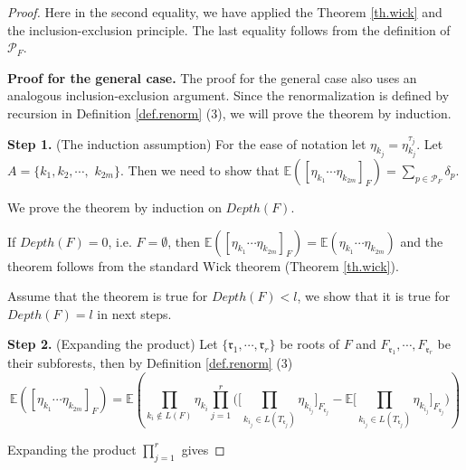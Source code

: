 \begin{proof}
Here in the second equality, we have applied the Theorem \ref{th.wick} and the inclusion-exclusion principle. The last equality follows from the definition of $\mathcal{P}_F$.

\textbf{Proof for the general case.} The proof for the general case also uses an analogous inclusion-exclusion argument. Since the renormalization is defined by recursion in Definition \ref{def.renorm} (3), we will prove the theorem by induction. 

\textbf{Step 1.} (The induction assumption) For the ease of notation let $\eta_{k_j}=\eta^{\tau_j}_{k_j}$. Let $A=\{k_1,k_2,\cdots,$ $k_{2m}\}$. Then we need to show that $\mathbb{E}([\eta_{k_1}\cdots \eta_{k_{2m}}]_F)=\sum_{p\in \mathcal{P}_F}\delta_p$.

We prove the theorem by induction on $Depth(F)$.

If $Depth(F)=0$, i.e. $F=\emptyset$, then $\mathbb{E}([\eta_{k_1}\cdots \eta_{k_{2m}}]_F)=\mathbb{E}(\eta_{k_1}\cdots \eta_{k_{2m}})$ and the theorem follows from the standard Wick theorem (Theorem \ref{th.wick}).

Assume that the theorem is true for $Depth(F)<l$, we show that it is true for $Depth(F)=l$ in next steps.

\textbf{Step 2.} (Expanding the product) Let $\{\mathfrak{r}_1,\cdots, \mathfrak{r}_r\}$ be roots of $F$ and $F_{\mathfrak{r}_1},\cdots,F_{\mathfrak{r}_r}$ be their subforests, then by Definition \ref{def.renorm} (3)
\begin{equation}
    \mathbb{E}([\eta_{k_1}\cdots \eta_{k_{2m}}]_F)=\mathbb{E}\left(\prod_{k_i\notin L(F)} \eta_{k_i} \prod_{j=1}^r \Bigg(\Bigg[\prod_{k_{i_j}\in L(T_{\mathfrak{r}_j})}\eta_{k_{i_j}}\Bigg]_{F_{\mathfrak{r}_j}}-\mathbb{E}\Bigg[\prod_{k_{i_j}\in L(T_{\mathfrak{r}_j})}\eta_{k_{i_j}}\Bigg]_{F_{\mathfrak{r}_j}}\Bigg)\right)
\end{equation}


Expanding the product $\prod_{j=1}^r$ gives


\end{proof}

